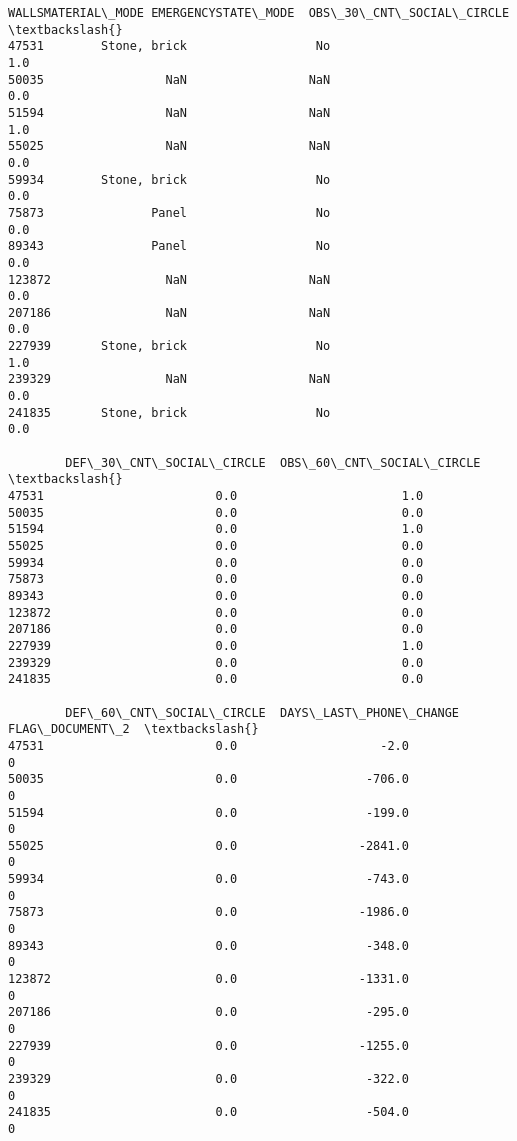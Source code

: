 \documentclass[11pt]{article}
\begin{document}
\begin{tcolorbox}[breakable, size=fbox, boxrule=.5pt, pad at break*=1mm, opacityfill=0]
\begin{Verbatim}[commandchars=\\\{\}]
       WALLSMATERIAL\_MODE EMERGENCYSTATE\_MODE  OBS\_30\_CNT\_SOCIAL\_CIRCLE  \textbackslash{}
47531        Stone, brick                  No                       1.0
50035                 NaN                 NaN                       0.0
51594                 NaN                 NaN                       1.0
55025                 NaN                 NaN                       0.0
59934        Stone, brick                  No                       0.0
75873               Panel                  No                       0.0
89343               Panel                  No                       0.0
123872                NaN                 NaN                       0.0
207186                NaN                 NaN                       0.0
227939       Stone, brick                  No                       1.0
239329                NaN                 NaN                       0.0
241835       Stone, brick                  No                       0.0

        DEF\_30\_CNT\_SOCIAL\_CIRCLE  OBS\_60\_CNT\_SOCIAL\_CIRCLE  \textbackslash{}
47531                        0.0                       1.0
50035                        0.0                       0.0
51594                        0.0                       1.0
55025                        0.0                       0.0
59934                        0.0                       0.0
75873                        0.0                       0.0
89343                        0.0                       0.0
123872                       0.0                       0.0
207186                       0.0                       0.0
227939                       0.0                       1.0
239329                       0.0                       0.0
241835                       0.0                       0.0

        DEF\_60\_CNT\_SOCIAL\_CIRCLE  DAYS\_LAST\_PHONE\_CHANGE  FLAG\_DOCUMENT\_2  \textbackslash{}
47531                        0.0                    -2.0                0
50035                        0.0                  -706.0                0
51594                        0.0                  -199.0                0
55025                        0.0                 -2841.0                0
59934                        0.0                  -743.0                0
75873                        0.0                 -1986.0                0
89343                        0.0                  -348.0                0
123872                       0.0                 -1331.0                0
207186                       0.0                  -295.0                0
227939                       0.0                 -1255.0                0
239329                       0.0                  -322.0                0
241835                       0.0                  -504.0                0


\end{Verbatim}
\end{tcolorbox}
\end{document}
